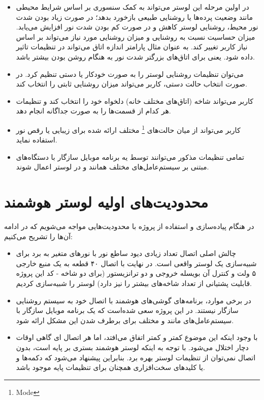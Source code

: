 \documentclass[12pt,a4paper]{article}
\begin{document}
	\begin{itemize}
		\item
		در اولین مرحله این لوستر می‌تواند به کمک سنسوری بر اساس شرایط محیطی مانند وضعیت پرده‌ها یا روشنایی طبیعی بازخورد بدهد؛ در صورت زیاد بودن شدت نور محیط، روشنایی لوستر کاهش و در صورت کم بودن شدت نور افزایش می‌یابد. میزان حساسیت نسبت به روشنایی و میزان روشنایی مورد نیاز می‌تواند بر اساس نیاز کاربر تغییر کند. به عنوان مثال پارامتر‌ اندازه اتاق می‌تواند در تنظیمات تاثیر داده شود. یعنی برای اتاق‌های بزرگتر شدت نور به هنگام روشن بودن بیشتر باشد. 
		\item
		می‌توان تنظیمات روشنایی لوستر را به صورت خودکار یا دستی تنظیم کرد. در صورت انتخاب حالت دستی، کاربر می‌تواند میزان روشنایی ثابتی را انتخاب کند.
		\item
		کاربر می‌تواند شاخه (اتاق‌های مختلف خانه) دلخواه خود را انتخاب کند و تنظیمات هر کدام از قسمت‌ها را به صورت جداگانه انجام دهد.
		\item
		کاربر می‌تواند از میان حالت‌های‌ \footnote{Mode} مختلف ارائه شده برای زیبایی یا رقص نور استفاده نماید.
		\item
		تمامی تنظیمات مذکور می‌توانند توسط یه برنامه موبایل سازگار با دستگاه‌های مبتنی بر سیستم‌عامل‌های مختلف همانند  و  در لوستر اعمال شوند.
	\end{itemize}
	\newpage
	\section{محدودیت‌های اولیه لوستر هوشمند}
	
	در هنگام پیاده‌سازی و استفاده از پروژه با محدودیت‌هایی مواجه می‌شویم که در ادامه آن‌ها را تشریح می‌کنیم:
	
	\begin{itemize}
		\item
		چالش اصلی اتصال تعداد زیادی دیود ساطع نور  با نورهای متغیر به برد برای شبیه‌سازی یک لوستر واقعی است. در نهایت با اتصال ۴۰ قطعه  به یک منبع خارجی ۵ ولت و کنترل آن بویسله خروجی  و دو ترانزیستور (برای دو شاخه - کد این پروژه قابلیت پشتیانی از تعداد شاخه‌های بیشتر را نیز دارد) لوستر را شبیه‌سازی کردیم.
		\item
		در برخی موارد، برنامه‌های گوشی‌های هوشمند با اتصال خود به سیستم روشنایی سازگار نیستند. در این پروژه سعی شده‌است که یک برنامه موبایل سازگار با سیستم‌عامل‌های مانند و  مختلف برای برطرف شدن این مشکل ارائه شود.
		\item
		با وجود اینکه این موضوع کمتر و کمتر اتفاق می‌افتد، اما هر اتصال ‌ای گاهی اوقات دچار اختلال می‌شود. با توجه به اینکه لوستر هوشمند بستری بر پایه  است، بدون اتصال  نمی‌توان از تنظیمات لوستر بهره برد. بنابراین پیشنهاد می‌شود که دکمه‌ها و یا کلید‌های سخت‌افزاری همچنان برای تنظیمات پایه‌ موجود باشد.
	\end{itemize}
	\newpage
\end{document}
